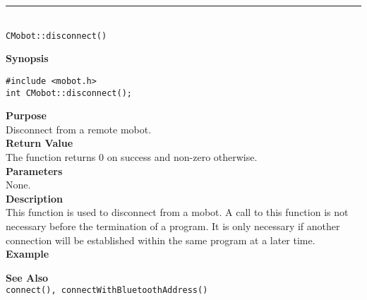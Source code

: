 \noindent
\vspace{5pt}
\rule{4.5in}{0.015in}\\
\noindent
{\LARGE \texttt{CMobot::disconnect()}}\\
{}

\noindent
{\bf Synopsis}
\vspace{-8pt}
\begin{verbatim}
#include <mobot.h>
int CMobot::disconnect();
\end{verbatim}

\noindent
{\bf Purpose}\\
Disconnect from a remote mobot.\\

\noindent
{\bf Return Value}\\
The function returns 0 on success and non-zero otherwise.\\

\noindent
{\bf Parameters}\\
None.\\

\noindent
{\bf Description}\\
This function is used to disconnect from a mobot. A call to this function is
not necessary before the termination of a program. It is only necessary if
another connection will be established within the same program at a later time.
\\

\noindent
{\bf Example}\\
\noindent

\noindent
{\bf See Also}\\
\texttt{connect(), connectWithBluetoothAddress()}

